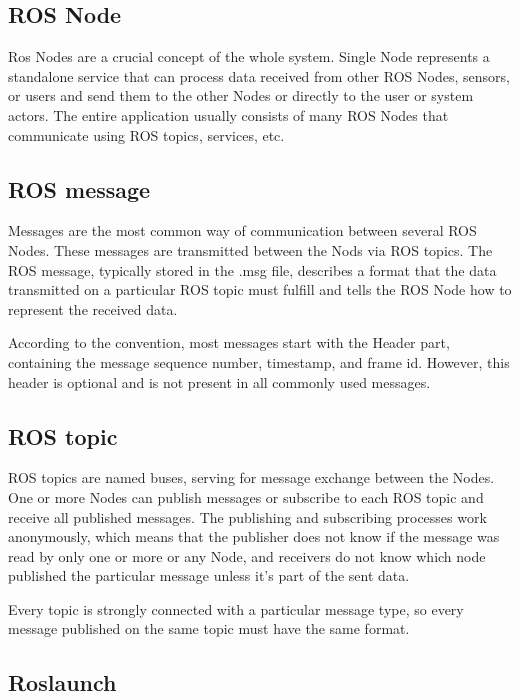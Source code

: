 \subsection*{ROS Node}

Ros Nodes are a crucial concept of the whole system. Single Node represents a standalone service that can process data received from other ROS Nodes, sensors, or users and send them to the other Nodes or directly to the user or system actors. The entire application usually consists of many ROS Nodes that communicate using ROS topics, services, etc.

\subsection*{ROS message}

Messages are the most common way of communication between several ROS Nodes. These messages are transmitted between the Nods via ROS topics. The ROS message, typically stored in the .msg file, describes a format that the data transmitted on a particular ROS topic must fulfill and tells the ROS Node how to represent the received data.\par
According to the convention, most messages start with the Header part, containing the message sequence number, timestamp, and frame id. However, this header is optional and is not present in all commonly used messages.

\subsection*{ROS topic}

ROS topics are named buses, serving for message exchange between the Nodes. One or more Nodes can publish messages or subscribe to each ROS topic and receive all published messages. The publishing and subscribing processes work anonymously, which means that the publisher does not know if the message was read by only one or more or any Node, and receivers do not know which node published the particular message unless it's part of the sent data.\par
Every topic is strongly connected with a particular message type, so every message published on the same topic must have the same format.

\subsection*{Roslaunch}

